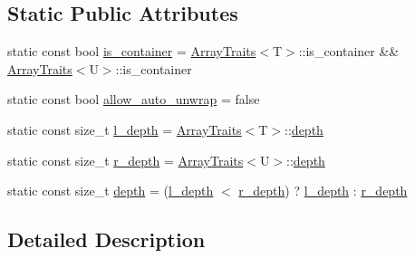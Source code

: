 \subsection*{Static Public Attributes}
\begin{DoxyCompactItemize}
\item 
static const bool \hyperlink{classgnuplotio_1_1_array_traits_3_01std_1_1pair_3_01_t_00_01_u_01_4_01_4_a8656ab8094037d88b470f718ff7197e0}{is\+\_\+container} = \hyperlink{classgnuplotio_1_1_array_traits}{Array\+Traits}$<$T$>$\+::is\+\_\+container \&\& \hyperlink{classgnuplotio_1_1_array_traits}{Array\+Traits}$<$U$>$\+::is\+\_\+container
\item 
static const bool \hyperlink{classgnuplotio_1_1_array_traits_3_01std_1_1pair_3_01_t_00_01_u_01_4_01_4_afff9ebffb39ab8660bb59ffcc7d8a2e5}{allow\+\_\+auto\+\_\+unwrap} = false
\item 
static const size\+\_\+t \hyperlink{classgnuplotio_1_1_array_traits_3_01std_1_1pair_3_01_t_00_01_u_01_4_01_4_ae8be9661c88a8970da3d87c1afc063dc}{l\+\_\+depth} = \hyperlink{classgnuplotio_1_1_array_traits}{Array\+Traits}$<$T$>$\+::\hyperlink{classgnuplotio_1_1_array_traits_3_01std_1_1pair_3_01_t_00_01_u_01_4_01_4_a11b3be89ac9506fcfcceb318acc7e2bf}{depth}
\item 
static const size\+\_\+t \hyperlink{classgnuplotio_1_1_array_traits_3_01std_1_1pair_3_01_t_00_01_u_01_4_01_4_a1b7e7f8976a5d0ed20b93ede3e25a546}{r\+\_\+depth} = \hyperlink{classgnuplotio_1_1_array_traits}{Array\+Traits}$<$U$>$\+::\hyperlink{classgnuplotio_1_1_array_traits_3_01std_1_1pair_3_01_t_00_01_u_01_4_01_4_a11b3be89ac9506fcfcceb318acc7e2bf}{depth}
\item 
static const size\+\_\+t \hyperlink{classgnuplotio_1_1_array_traits_3_01std_1_1pair_3_01_t_00_01_u_01_4_01_4_a11b3be89ac9506fcfcceb318acc7e2bf}{depth} = (\hyperlink{classgnuplotio_1_1_array_traits_3_01std_1_1pair_3_01_t_00_01_u_01_4_01_4_ae8be9661c88a8970da3d87c1afc063dc}{l\+\_\+depth} $<$ \hyperlink{classgnuplotio_1_1_array_traits_3_01std_1_1pair_3_01_t_00_01_u_01_4_01_4_a1b7e7f8976a5d0ed20b93ede3e25a546}{r\+\_\+depth}) ? \hyperlink{classgnuplotio_1_1_array_traits_3_01std_1_1pair_3_01_t_00_01_u_01_4_01_4_ae8be9661c88a8970da3d87c1afc063dc}{l\+\_\+depth} \+: \hyperlink{classgnuplotio_1_1_array_traits_3_01std_1_1pair_3_01_t_00_01_u_01_4_01_4_a1b7e7f8976a5d0ed20b93ede3e25a546}{r\+\_\+depth}
\end{DoxyCompactItemize}


\subsection{Detailed Description}
